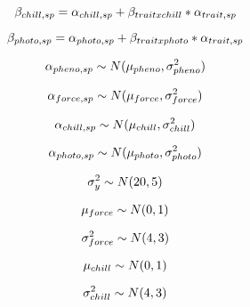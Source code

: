 \documentclass{article}
\begin{document}
\begin{equation}
\beta_{chill,sp} = \alpha_{chill,sp} + \beta_{trait x chill}*\alpha_{trait, sp} \\
\end{equation}

\begin{equation}
\beta_{photo,sp} = \alpha_{photo,sp} + \beta_{trait x photo}*\alpha_{trait, sp} \\
\end{equation}

\begin{equation}
\alpha_{pheno,sp}\sim N(\mu_{pheno}, \sigma^2_{pheno})\\
\end{equation}

\begin{equation}
\alpha_{force,sp}\sim N(\mu_{force}, \sigma^2_{force})\\
\end{equation}

\begin{equation}
\alpha_{chill,sp}\sim N(\mu_{chill}, \sigma^2_{chill})\\
\end{equation}

\begin{equation}
\alpha_{photo,sp}\sim N(\mu_{photo}, \sigma^2_{photo})\\
\end{equation}

\begin{equation}
\sigma^2_{y}\sim N(20,  5)\\
\end{equation}

\begin{equation}
\mu_{force} \sim N(0,1)\\
\end{equation}

\begin{equation}
\sigma^2_{force}\sim N(4,3)\\
\end{equation}

\begin{equation}
\mu_{chill} \sim N(0,1)\\
\end{equation}

\begin{equation}
\sigma^2_{chill} \sim N(4,3)\\
\end{equation}
\end{document}
